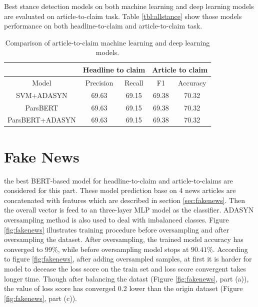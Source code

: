 Best stance detection models on both machine learning and deep learning models are evaluated on article-to-claim task. Table \ref{tbl:allstance} show those models performance on both headline-to-claim and article-to-claim task. 

\begin{table}[t]
	\centering
	\small
	\caption{Comparison of article-to-claim machine learning and deep learning models.}
	\def\arraystretch{1.3}%
	\setlength{\extrarowheight}{5pt}%
	\begin{tabular}{|c|c|c|c|c|}
		\hline
		{} & \multicolumn{2}{c|}{Headline to claim} &  \multicolumn{2}{c|}{Article to claim}\\
		\hline 
		{Model} & {Precision} & {Recall} & {F1} & {Accuracy}\\
		\hline	\hline
		{SVM+ADASYN} & {69.63} & {69.15} & {69.38} & {70.32}\\
		\hline
		{ParsBERT} & {69.63} & {69.15} & {69.38} & {70.32}\\
		\hline
		{ParsBERT+ADASYN} & {69.63} & {69.15} & {69.38} & {70.32}\\
		\hline
	\end{tabular}
	\label{tbl:a2c}
\end{table}

\section{Fake News}
the best BERT-based model for headline-to-claim and article-to-claims are considered for this part. These model prediction base on 4 news articles are concatenated with features which are described in section \ref{sec:fakenews}. Then the overall vector is feed to an three-layer MLP model as the classifier. ADASYN oversampling method is also used to deal with imbalanced classes. Figure \ref{fig:fakenews} illustrates training procedure before oversampling and after oversampling the dataset. After oversampling, the trained model accuracy has converged to 99\%, while before oversampling model stops at $90.41\%$. According to figure \ref{fig:fakenews}, after adding oversampled samples, at first it is harder for model to decease the loss score on the train set and loss score convergent takes longer time. Though after balancing the datast (Figure \ref{fig:fakenews}, part (a)), the value of loss score has converged 0.2 lower than the origin dataset (Figure \ref{fig:fakenews}, part (c)).

